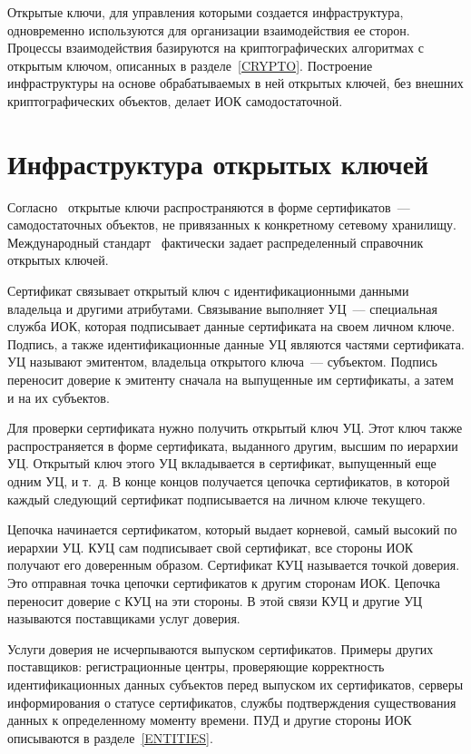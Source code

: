 Открытые ключи, для управления которыми создается инфраструктура, одновременно
используются для организации взаимодействия ее сторон.
%
Процессы взаимодействия базируются на криптографических алгоритмах с открытым
ключом, описанных в разделе~\ref{CRYPTO}.
%
Построение инфраструктуры на основе обрабатываемых в ней открытых ключей, без
внешних криптографических объектов, делает ИОК самодостаточной.

\section{Инфраструктура открытых ключей}\label{COMMON.PKI}

Согласно~\cite{X509} открытые ключи распространяются в форме сертификатов~---
самодостаточных объектов, не привязанных к конкретному сетевому хранилищу.
Международный стандарт~\cite{X509} фактически задает распределенный справочник
открытых ключей.

Сертификат связывает открытый ключ с идентификационными данными владельца и
другими атрибутами. Связывание выполняет УЦ~--- специальная служба ИОК, которая
подписывает данные сертификата на своем личном ключе. Подпись, а также
идентификационные данные УЦ являются частями сертификата. УЦ называют эмитентом,
владельца открытого ключа~--- субъектом. Подпись переносит доверие к эмитенту
сначала на выпущенные им сертификаты, а затем и на их субъектов.

Для проверки сертификата нужно получить открытый ключ УЦ. Этот ключ также
распространяется в форме сертификата, выданного другим, высшим по иерархии УЦ.
Открытый ключ этого УЦ вкладывается в сертификат, выпущенный еще одним УЦ, и
т.~д. В конце концов получается цепочка сертификатов, в которой каждый следующий
сертификат подписывается на личном ключе текущего.

Цепочка начинается сертификатом, который выдает корневой, самый высокий по
иерархии УЦ. КУЦ сам подписывает свой сертификат, все стороны ИОК получают его
доверенным образом. Сертификат КУЦ называется точкой доверия. Это отправная
точка цепочки сертификатов к другим сторонам ИОК. Цепочка переносит доверие с
КУЦ на эти стороны. В этой связи КУЦ и другие УЦ называются поставщиками услуг
доверия.

Услуги доверия не исчерпываются выпуском сертификатов. Примеры других
поставщиков: регистрационные центры, проверяющие корректность идентификационных
данных субъектов перед выпуском их сертификатов, серверы информирования о
статусе сертификатов, службы подтверждения существования данных к определенному
моменту времени.
%
ПУД и другие стороны ИОК описываются в разделе~\ref{ENTITIES}.

